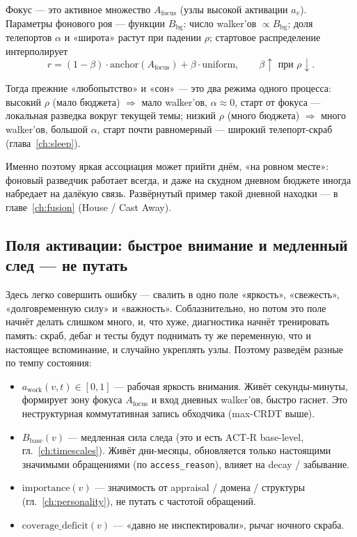 Фокус --- это активное множество $A_{\text{focus}}$ (узлы высокой активации
$a_v$). Параметры фонового роя --- функции $B_{\text{bg}}$: число walker'ов
$\propto B_{\text{bg}}$; доля телепортов $\alpha$ и «широта» растут при падении
$\rho$; стартовое распределение интерполирует
\[
r = (1 - \beta)\cdot \mathrm{anchor}(A_{\text{focus}}) + \beta\cdot \mathrm{uniform},
\qquad \beta \uparrow \text{ при } \rho \downarrow.
\]

Тогда прежние «любопытство» и «сон» --- это два режима одного процесса:
высокий $\rho$ (мало бюджета) $\Rightarrow$ мало walker'ов, $\alpha \approx 0$,
старт от фокуса --- локальная разведка вокруг текущей темы; низкий $\rho$
(много бюджета) $\Rightarrow$ много walker'ов, большой $\alpha$, старт почти
равномерный --- широкий телепорт-скраб (глава~\ref{ch:sleep}).

\begin{intuition}
Именно поэтому яркая ассоциация может прийти днём, «на ровном месте»:
фоновый разведчик работает всегда, и даже на скудном дневном бюджете иногда
набредает на далёкую связь. Развёрнутый пример такой дневной находки ---
в главе~\ref{ch:fusion} (House / Cast Away).
\end{intuition}

\subsection{Поля активации: быстрое внимание и медленный след --- не путать}
\label{sec:brightness}

Здесь легко совершить ошибку --- свалить в одно поле «яркость», «свежесть»,
«долговременную силу» и «важность». Соблазнительно, но потом это поле начнёт
делать слишком много, и, что хуже, диагностика начнёт тренировать память:
скраб, дебаг и тесты будут поднимать ту же переменную, что и настоящее
вспоминание, и случайно укреплять узлы. Поэтому разведём разные по темпу
состояния:
\begin{itemize}
\item $a_{\text{work}}(v,t) \in [0,1]$ --- рабочая яркость внимания. Живёт
секунды-минуты, формирует зону фокуса $A_{\text{focus}}$ и вход дневных
walker'ов, быстро гаснет. Это неструктурная коммутативная запись обходчика
(max-CRDT выше).
\item $B_{\text{base}}(v)$ --- медленная сила следа (это и есть ACT-R base-level,
гл.~\ref{ch:timescales}). Живёт дни-месяцы, обновляется только настоящими
значимыми обращениями (по \texttt{access\_reason}), влияет на decay / забывание.
\item $\mathrm{importance}(v)$ --- значимость от appraisal / домена / структуры
(гл.~\ref{ch:personality}), не путать с частотой обращений.
\item $\mathrm{coverage\_deficit}(v)$ --- «давно не инспектировали», рычаг
ночного скраба.
\end{itemize}

